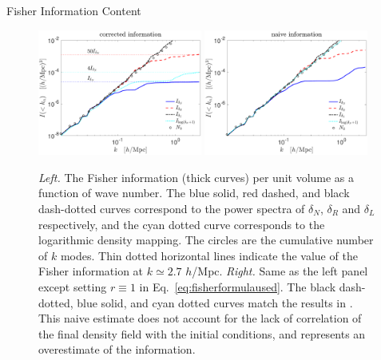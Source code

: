\begin{section}{Fisher Information Content}
  \begin{figure}
    \includegraphics[width=0.48\textwidth]{fig4a.pdf}
    \includegraphics[width=0.48\textwidth]{fig4b.pdf}
    \centering
    \caption{{\it Left.} The Fisher information (thick curves) per unit volume as
      a function of wave number.  The blue solid, red dashed, and black dash-dotted curves correspond to the power spectra
      of $\delta_N$, $\delta_R$ and $\delta_L$ respectively,
      and the cyan dotted curve
      corresponds to the logarithmic density mapping. The circles
      are the cumulative number of $k$ modes.  Thin dotted horizontal lines indicate the value of the 
      Fisher information at $k \simeq 2.7$ $h$/Mpc.  {\it Right.} Same
      as the left panel except setting $r\equiv 1$ in Eq.~\ref{eq:fisherformulaused}. The
      black dash-dotted, blue solid, and cyan dotted curves match the results in \citealt{bib:Rimes2006,bib:Mark2009}. 
This naive estimate does not account for the lack of correlation
of the final density field with the initial conditions, and represents
an overestimate of the information.}
  \label{fig:fisherinfo}
\end{figure}
\end{section}
